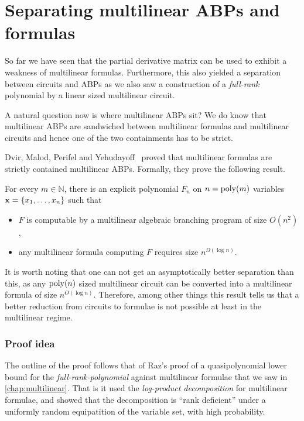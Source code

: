\chapter{Separating multilinear ABPs and formulas}\label{chap:DMPY}

So far we have seen that the partial derivative matrix can be used to exhibit a weakness of multilinear formulas. Furthermore, this also yielded a separation between circuits and ABPs as we also saw a construction of a \emph{full-rank}  polynomial by a linear sized multilinear circuit.

A natural question now is where multilinear ABPs sit? We do know that multilinear ABPs are sandwiched between multilinear formulas and multilinear circuits and hence one of the two containments has to be strict.

\begin{definition}

\end{definition}

Dvir, Malod, Perifel and Yehudayoff~\cite{dmpy12} proved that multilinear formulas are strictly contained multilinear ABPs. Formally, they prove the following result.

\begin{theorem}
\label{thm:separation}
For every $m \in \mathbb{N}$, there is an explicit polynomial $F_n$ on $n = \operatorname{poly}(m)$ variables $\mathbf{x} = \left\{x_1,\ldots,x_n\right\}$ such that
\begin{itemize}
\item $F$ is computable by a multilinear algebraic branching program of size $O(n^2)$,
\item any multilinear formula computing $F$ requires size $n^{\Omega(\log n)}$.
\end{itemize}
\end{theorem}

It is worth noting that one can not get an asymptotically better separation than this, as any $\operatorname{poly}(n)$ sized multilinear circuit can be converted into a multilinear formula of size $n^{O(\log n)}$.
Therefore, among other things this result tells us that a better reduction from circuits to formulae is not possible at least in the multilinear regime.

\subsection*{Proof idea}

The outline of the proof follows that of Raz's proof \cite{raz2004} of a quasipolynomial lower bound for the \emph{full-rank-polynomial} against multilinear formulae that we saw in \autoref{chap:multilinear}. That is it used the \emph{log-product decomposition} for multilinear formulae, and showed that the decomposition is ``rank deficient'' under a uniformly random equipatition of the variable set, with high probability.

